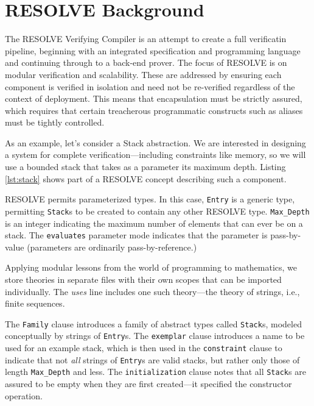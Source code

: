 \chapter{RESOLVE Background}\label{sec:resolveBackground}
The RESOLVE\cite{RESOLVE} Verifying Compiler is an attempt to create a full verificatin pipeline, beginning with an integrated specification and programming language and continuing through to a back-end prover.  The focus of RESOLVE is on modular verification and scalability.  These are addressed by ensuring each component is verified in isolation and need not be re-verified regardless of the context of deployment.  This means that encapsulation must be strictly assured, which requires that certain treacherous programmatic constructs such as aliases must be tightly controlled.

As an example, let's consider a Stack abstraction.  We are interested in designing a system for complete verification---including constraints like memory, so we will use a bounded stack that takes as a parameter its maximum depth.  Listing \ref{lst:stack} shows part of a RESOLVE concept describing such a component.



RESOLVE permits parameterized types.  In this case, \texttt{Entry} is a generic type, permitting \texttt{Stack}s to be created to contain any other RESOLVE type.  \texttt{Max\_Depth} is an integer indicating the maximum number of elements that can ever be on a stack.  The \texttt{evaluates} parameter mode indicates that the parameter is pass-by-value (parameters are ordinarily pass-by-reference.)

Applying modular lessons from the world of programming to mathematics, we store theories in separate files with their own scopes that can be imported individually\cite{smith08}.  The \emph{uses} line includes one such theory---the theory of strings, i.e., finite sequences.

The \texttt{Family} clause introduces a family of abstract types called \texttt{Stack}s, modeled conceptually by strings of \texttt{Entry}s.  The \texttt{exemplar} clause introduces a name to be used for an example stack, which is then used in the \texttt{constraint} clause to indicate that not \emph{all} strings of \texttt{Entry}s are valid stacks, but rather only those of length \texttt{Max\_Depth} and less.  The \texttt{initialization} clause notes that all \texttt{Stack}s are assured to be empty when they are first created---it specified the constructor operation.

